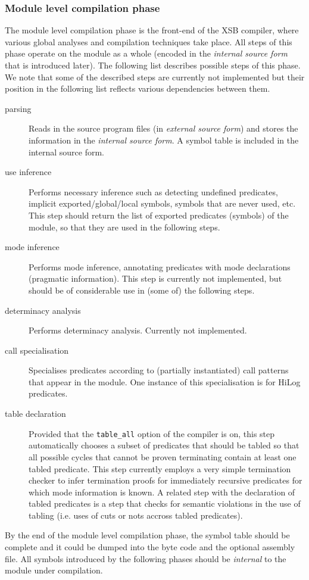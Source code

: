 \subsubsection{Module level compilation phase}
The module level compilation phase is the front-end of the XSB
compiler, where various global analyses and compilation techniques
take place.  All steps of this phase operate on the module as a whole
(encoded in the {\it internal source form} that is introduced later).
The following list describes possible steps of this phase.  We note
that some of the described steps are currently not implemented but their
position in the following list reflects various dependencies between them.
\begin{description}
\item[parsing]
	Reads in the source program files (in {\it external source form})
	and stores the information in the {\it internal source form}.
	A symbol table is included in the internal source form.
\item[use inference]
	Performs necessary inference such as detecting undefined predicates,
	implicit exported/global/local symbols, symbols that are never
	used, etc.  This step should return the list of exported
	predicates (symbols) of the module, so that they are used in
	the following steps.
\item[mode inference]
	Performs mode inference, annotating predicates with mode declarations
	(pragmatic information).  This step is currently not implemented,
	but should be of considerable use in (some of) the following steps.
\item[determinacy analysis]
	Performs determinacy analysis.  Currently not implemented.
\item[call specialisation]
	Specialises predicates according to (partially instantiated)
	call patterns that appear in the module.  One instance of this
	specialisation is for HiLog predicates.
\item[table declaration]
	Provided that the {\tt table\_all} option of the compiler is
	on, this step automatically chooses a subset of predicates that
	should be tabled so that all possible cycles that cannot be proven
	terminating contain at least one tabled predicate.  This step
	currently employs a very simple termination checker to infer
	termination proofs for immediately recursive predicates for which
	mode information is known.
	A related step with the declaration of tabled predicates is a step
	that checks for semantic violations in the use of tabling
	(i.e. uses of cuts or nots accross tabled predicates).
\end{description}
By the end of the module level compilation phase, the symbol table
should be complete and it could be dumped into the byte code and the
optional assembly file.  All symbols introduced by the following
phases should be {\em internal\/} to the module under compilation.


